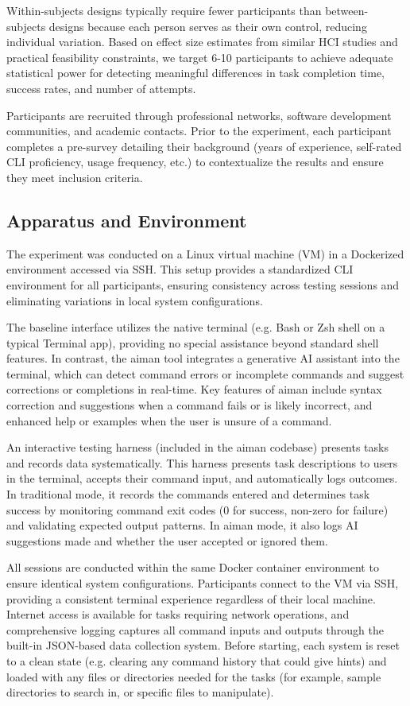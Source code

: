 Within-subjects designs typically require fewer participants than between-subjects designs because each person serves as their own control, reducing individual variation. Based on effect size estimates from similar HCI studies and practical feasibility constraints, we target 6-10 participants to achieve adequate statistical power for detecting meaningful differences in task completion time, success rates, and number of attempts.

Participants are recruited through professional networks, software development communities, and academic contacts. Prior to the experiment, each participant completes a pre-survey detailing their background (years of experience, self-rated CLI proficiency, usage frequency, etc.) to contextualize the results and ensure they meet inclusion criteria.

\subsection{Apparatus and Environment}

The experiment was conducted on a Linux virtual machine (VM) in a Dockerized environment accessed via SSH. This setup provides a standardized CLI environment for all participants, ensuring consistency across testing sessions and eliminating variations in local system configurations.

The baseline interface utilizes the native terminal (e.g. Bash or Zsh shell on a typical Terminal app), providing no special assistance beyond standard shell features. In contrast, the aiman tool integrates a generative AI assistant into the terminal, which can detect command errors or incomplete commands and suggest corrections or completions in real-time. Key features of aiman include syntax correction and suggestions when a command fails or is likely incorrect, and enhanced help or examples when the user is unsure of a command.

An interactive testing harness (included in the aiman codebase) presents tasks and records data systematically. This harness presents task descriptions to users in the terminal, accepts their command input, and automatically logs outcomes. In traditional mode, it records the commands entered and determines task success by monitoring command exit codes (0 for success, non-zero for failure) and validating expected output patterns. In aiman mode, it also logs AI suggestions made and whether the user accepted or ignored them.

All sessions are conducted within the same Docker container environment to ensure identical system configurations. Participants connect to the VM via SSH, providing a consistent terminal experience regardless of their local machine. Internet access is available for tasks requiring network operations, and comprehensive logging captures all command inputs and outputs through the built-in JSON-based data collection system. Before starting, each system is reset to a clean state (e.g. clearing any command history that could give hints) and loaded with any files or directories needed for the tasks (for example, sample directories to search in, or specific files to manipulate).

